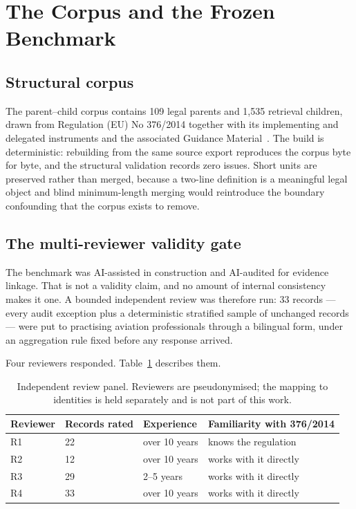 \section{The Corpus and the Frozen Benchmark}
\label{sec:frozen-benchmark}

\subsection{Structural corpus}

The parent--child corpus contains 109 legal parents and 1{,}535 retrieval
children, drawn from Regulation (EU) No 376/2014 together with its implementing
and delegated instruments and the associated Guidance
Material~\cite{eu2014reg376,easa2022easyaccess376}. The build is deterministic:
rebuilding from the same source export reproduces the corpus byte for byte, and
the structural validation records zero issues. Short units are preserved rather
than merged, because a two-line definition is a meaningful legal object and blind
minimum-length merging would reintroduce the boundary confounding that the corpus
exists to remove.

\subsection{The multi-reviewer validity gate}
\label{sec:review-results}

The benchmark was AI-assisted in construction and AI-audited for evidence
linkage. That is not a validity claim, and no amount of internal consistency
makes it one. A bounded independent review was therefore run: 33 records --- every
audit exception plus a deterministic stratified sample of unchanged records ---
were put to practising aviation professionals through a bilingual form, under an
aggregation rule fixed before any response arrived.

Four reviewers responded. Table~\ref{tab:reviewers} describes them.

\begin{table}[htbp]
  \centering
  \caption{Independent review panel. Reviewers are pseudonymised; the mapping to identities is held separately and is not part of this work.}
  \label{tab:reviewers}
  \begin{tabular}{llll}
    \toprule
    \textbf{Reviewer} & \textbf{Records rated} & \textbf{Experience} & \textbf{Familiarity with 376/2014} \\
    \midrule
    R1 & 22 & over 10 years & knows the regulation \\
    R2 & 12 & over 10 years & works with it directly \\
    R3 & 29 & 2--5 years & works with it directly \\
    R4 & 33 & over 10 years & works with it directly \\
    \bottomrule
  \end{tabular}
\end{table}

